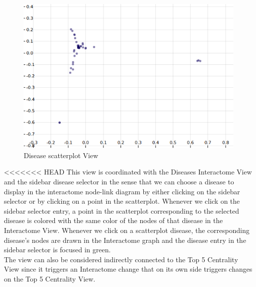 \documentclass[12pt,twocolumn,twoside]{article}
\begin{document}
	\begin{figure}
		\includegraphics[width=.95\linewidth]{disease-scatterplot-mds.png}
		\caption{Disease scatterplot View}
		\label{scatter}
	\end{figure}
<<<<<<< HEAD
	This view is coordinated with the Diseases Interactome View and the sidebar disease selector in the sense that we can choose a disease to display in the interactome node-link diagram by either clicking on the sidebar selector or by clicking on a point in the scatterplot. Whenever we click on the sidebar selector entry, a point in the scatterplot corresponding to the selected disease is colored with the same color of the nodes of that disease in the Interactome View. Whenever we click on a scatterplot disease, the corresponding disease's nodes are drawn in the Interactome graph and the disease entry in the sidebar selector is focused in green.\\ The view can also be considered indirectly connected to the Top 5 Centrality View since it triggers an Interactome change that on its own side triggers changes on the Top 5 Centrality View. \\ 
	
\end{document}
